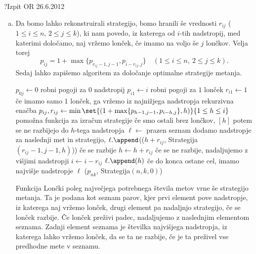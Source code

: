 \begin{naloga}{?}{Izpit OR 26.6.2012}
\begin{odgovor}
\begin{enumerate}[(a)]
\item Da bomo lahko rekonstruirali strategijo,
bomo hranili še vrednosti $r_{ij}$ ($1 \le i \le n$, $2 \le j \le k$),
ki nam povedo, iz katerega od $i$-tih nadstropij, med katerimi določamo,
naj vržemo lonček, če imamo na voljo še $j$ lončkov.
Velja torej
$$
p_{ij} = 1 + \max\{p_{r_{ij}-1,j-1}, p_{i-r_{ij},j}\}
\quad (1 \le i \le n, \ 2 \le j \le k) .
$$
Sedaj lahko zapišemo algoritem za določanje optimalne strategije metanja.
\begin{small}
\begin{algorithmic}
        \State $p_{0j} \gets 0$ \hfill robni pogoji za $0$ nadstropij
    \EndFor
        \State $p_{i1} \gets i$ \hfill robni pogoji za $1$ lonček
        \State $r_{i1} \gets 1$ \hfill če imamo samo $1$ lonček,
                                       ga vržemo iz najnižjega nadstropja
         \hfill rekurzivna enačba
            \State $p_{ij}, r_{ij} \gets \min\set{(1 + \max\{p_{h-1,j-1},
                                                             p_{i-h,j}\}, h)}%
                                                 {1 \le h \le i}$
        \EndFor
    \EndFor
            \hfill pomožna funkcija za izračun strategije
         \hfill če smo ostali brez lončkov,
            \State \Return $[h]$
                \hfill potem se ne razbijejo do $h$-tega nadstropja
        \EndIf
        \State $\ell \gets$ prazen seznam
                \hfill dodamo nadstropje za naslednji met in strategijo,
            \State $\ell.\append$(($h + r_{ij}$,
                {\sc Strategija$(r_{ij}-1, j-1, h)$})) \hfill če se razbije
            \State $h \gets h + r_{ij}$
                \hfill če se ne razbije, nadaljujemo z višjimi nadstropji
            \State $i \gets i - r_{ij}$
        \EndWhile
        \State $\ell.\append(h)$
            \hfill če do konca ostane cel, imamo najvišje nadstropje
        \State \Return $\ell$
    \EndFunction
    \State \Return ($p_{nk}$, {\sc Strategija}$(n, k, 0)$)
\EndFunction
\end{algorithmic}
\end{small}
Funkcija {\sc Lončki} poleg največjega potrebnega števila metov
vrne še strategijo metanja.
Ta je podana kot seznam parov,
kjer prvi element pove nadstropje, iz katerega naj vržemo lonček,
drugi element pa nadaljnjo strategijo, če se lonček razbije.
Če lonček preživi padec, nadaljujemo z naslednjim elementom seznama.
Zadnji element seznama je številka najvišjega nadstropja,
iz katerega lahko vržemo lonček, da se ta ne razbije,
če je ta preživel vse predhodne mete v seznamu.


\end{enumerate}
\end{odgovor}
\end{naloga}
